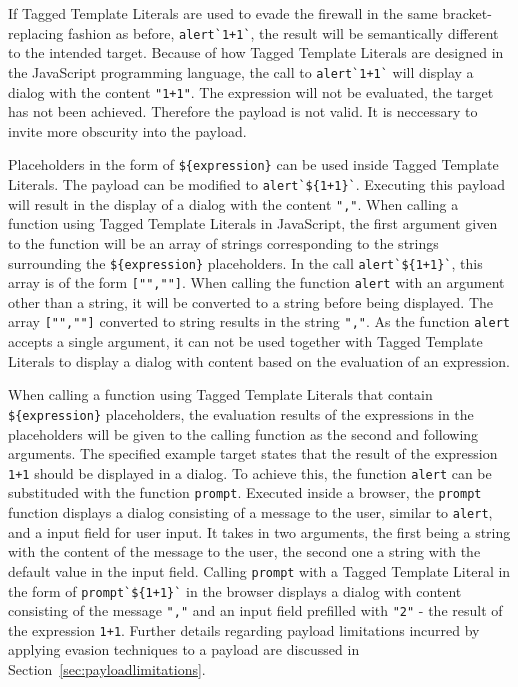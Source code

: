 If Tagged Template Literals are used to evade the firewall in the same bracket-replacing fashion as before, \verb|alert`1+1`|, the result will be semantically different to the intended target.
Because of how Tagged Template Literals are designed in the JavaScript programming language, the call to \verb|alert`1+1`| will display a dialog with the content \verb|"1+1"|. The expression will not be evaluated, the target has not been achieved. Therefore the payload is not valid. It is neccessary to invite more obscurity into the payload. 

Placeholders in the form of \verb|${expression}| can be used inside Tagged Template Literals. The payload can be modified to \verb|alert`${1+1}`|. Executing this payload will result in the display of a dialog with the content \verb|","|. When calling a function using Tagged Template Literals in JavaScript, the first argument given to the function will be an array of strings corresponding to the strings surrounding the \verb|${expression}| placeholders. In the call \verb|alert`${1+1}`|, this array is of the form \verb|["",""]|. When calling the function \verb|alert| with an argument other than a string, it will be converted to a string before being displayed. The array \verb|["",""]| converted to string results in the string \verb|","|. 
As the function \verb|alert| accepts a single argument, it can not be used together with Tagged Template Literals to display a dialog with content based on the evaluation of an expression.

When calling a function using Tagged Template Literals that contain \verb|${expression}| placeholders, the evaluation results of the expressions in the placeholders will be given to the calling function as the second and following arguments.
The specified example target states that the result of the expression \verb|1+1| should be displayed in a dialog.
To achieve this, the function \verb|alert| can be substituded with the function \verb|prompt|. Executed inside a browser, the \verb|prompt| function displays a dialog consisting of a message to the user, similar to \verb|alert|, and a input field for user input. It takes in two arguments, the first being a string with the content of the message to the user, the second one a string with the default value in the input field. 
Calling \verb|prompt| with a Tagged Template Literal in the form of \verb|prompt`${1+1}`| in the browser displays a dialog with content consisting of the message \verb|","| and an input field prefilled with \verb|"2"| - the result of the expression \verb|1+1|.  
Further details regarding payload limitations incurred by applying evasion techniques to a payload are discussed in Section~\ref{sec:payloadlimitations}.

